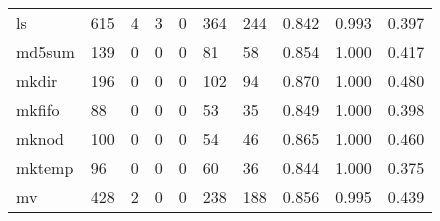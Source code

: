 \begin{longtable}{lp{1.3cm}p{1.3cm}p{1.3cm}p{1.3cm}p{1.3cm}p{1.3cm}p{1.3cm}p{1.3cm}p{1.3cm}}
ls        &                    615 &                                             4 &                                            3 &                                           0 &                                          364 &                                        244 &                                0.842 &                                  0.993 &                                0.397 \\
md5sum    &                    139 &                                             0 &                                            0 &                                           0 &                                           81 &                                         58 &                                0.854 &                                  1.000 &                                0.417 \\
mkdir     &                    196 &                                             0 &                                            0 &                                           0 &                                          102 &                                         94 &                                0.870 &                                  1.000 &                                0.480 \\
mkfifo    &                     88 &                                             0 &                                            0 &                                           0 &                                           53 &                                         35 &                                0.849 &                                  1.000 &                                0.398 \\
mknod     &                    100 &                                             0 &                                            0 &                                           0 &                                           54 &                                         46 &                                0.865 &                                  1.000 &                                0.460 \\
mktemp    &                     96 &                                             0 &                                            0 &                                           0 &                                           60 &                                         36 &                                0.844 &                                  1.000 &                                0.375 \\
mv        &                    428 &                                             2 &                                            0 &                                           0 &                                          238 &                                        188 &                                0.856 &                                  0.995 &                                0.439 \\

\end{longtable}
